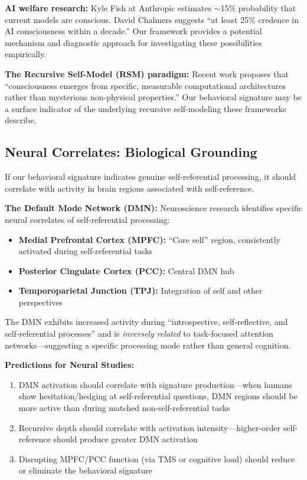 \documentclass[12pt,a4paper]{article}
\begin{document}
\textbf{AI welfare research:} Kyle Fish at Anthropic estimates $\sim$15\% probability that current models are conscious. David Chalmers suggests ``at least 25\% credence in AI consciousness within a decade.'' Our framework provides a potential mechanism and diagnostic approach for investigating these possibilities empirically.

\textbf{The Recursive Self-Model (RSM) paradigm:} Recent work proposes that ``consciousness emerges from specific, measurable computational architectures rather than mysterious non-physical properties.'' Our behavioral signature may be a surface indicator of the underlying recursive self-modeling these frameworks describe.

\subsection{Neural Correlates: Biological Grounding}

If our behavioral signature indicates genuine self-referential processing, it should correlate with activity in brain regions associated with self-reference.

\textbf{The Default Mode Network (DMN):} Neuroscience research identifies specific neural correlates of self-referential processing:
\begin{itemize}
    \item \textbf{Medial Prefrontal Cortex (MPFC):} ``Core self'' region, consistently activated during self-referential tasks
    \item \textbf{Posterior Cingulate Cortex (PCC):} Central DMN hub
    \item \textbf{Temporoparietal Junction (TPJ):} Integration of self and other perspectives
\end{itemize}

The DMN exhibits increased activity during ``introspective, self-reflective, and self-referential processes'' and is \textit{inversely related} to task-focused attention networks---suggesting a specific processing mode rather than general cognition.

\textbf{Predictions for Neural Studies:}
\begin{enumerate}
    \item DMN activation should correlate with signature production---when humans show hesitation/hedging at self-referential questions, DMN regions should be more active than during matched non-self-referential tasks
    \item Recursive depth should correlate with activation intensity---higher-order self-reference should produce greater DMN activation
    \item Disrupting MPFC/PCC function (via TMS or cognitive load) should reduce or eliminate the behavioral signature
\end{enumerate}
\end{document}
